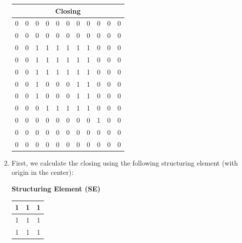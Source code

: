 \documentclass{article}
\begin{document}
\begin{enumerate}
    \begin{center}
        \begin{tabular}{|c|c|c|c|c|c|c|c|c|c|c|}
        \multicolumn{11}{c}{\textbf{Closing}} \\
        \hline
        0 & 0 & 0 & 0 & 0 & 0 & 0 & 0 & 0 & 0 & 0 \\
        \hline
        0 & 0 & 0 & 0 & 0 & 0 & 0 & 0 & 0 & 0 & 0 \\
        \hline
        0 & 0 & \cellcolor{blue!20}1 & \cellcolor{blue!20}1 & \cellcolor{blue!20}1 & \cellcolor{blue!20}1 & \cellcolor{blue!20}1 & \cellcolor{blue!20}1 & 0 & 0 & 0 \\
        \hline
        0 & 0 & \cellcolor{blue!20}1 & \cellcolor{blue!20}1 & \cellcolor{blue!20}1 & \cellcolor{blue!20}1 & \cellcolor{blue!20}1 & \cellcolor{blue!20}1 & 0 & 0 & 0 \\
        \hline
        0 & 0 & \cellcolor{blue!20}1 & \cellcolor{blue!20}1 & \cellcolor{blue!20}1 & \cellcolor{blue!20}1 & \cellcolor{blue!20}1 & \cellcolor{blue!20}1 & 0 & 0 & 0 \\
        \hline
        0 & 0 & \cellcolor{blue!20}1 & 0 & 0 & 0 & \cellcolor{blue!20}1 & \cellcolor{blue!20}1 & 0 & 0 & 0 \\
        \hline
        0 & 0 & \cellcolor{blue!20}1 & 0 & 0 & 0 & \cellcolor{blue!20}1 & \cellcolor{blue!20}1 & 0 & 0 & 0 \\
        \hline
        0 & 0 & 0 & \cellcolor{blue!20}1 & \cellcolor{blue!20}1 & \cellcolor{blue!20}1 & \cellcolor{blue!20}1 & \cellcolor{blue!20}1 & 0 & 0 & 0 \\
        \hline
        0 & 0 & 0 & 0 & 0 & 0 & 0 & 0 & \cellcolor{blue!20}1 & 0 & 0 \\
        \hline
        0 & 0 & 0 & 0 & 0 & 0 & 0 & 0 & 0 & 0 & 0 \\
        \hline
        0 & 0 & 0 & 0 & 0 & 0 & 0 & 0 & 0 & 0 & 0 \\
        \hline
        \end{tabular}
    \end{center}

    \item
    First, we calculate the closing using the following structuring element (with origin in the center):

    \begin{center}
        \textbf{Structuring Element (SE)} \\
        \begin{tabular}{|c|c|c|}
        \hline
        1 & 1 & 1 \\
        \hline
        1 & 1 & 1 \\
        \hline
        1 & 1 & 1 \\
        \hline
        \end{tabular}
    \end{center}


\end{enumerate}
\end{document}
